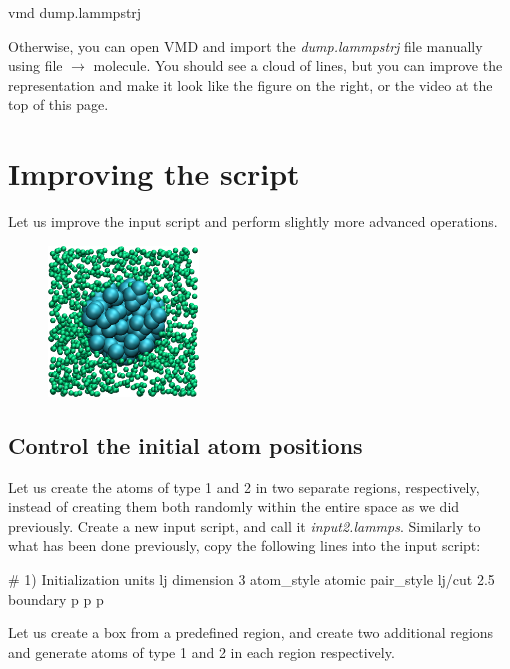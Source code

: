 \begin{lcverbatim}
vmd dump.lammpstrj
\end{lcverbatim}

\noindent Otherwise, you can open VMD and import the \textit{dump.lammpstrj}
file manually using file $\rightarrow$ molecule. You should see a cloud
of lines, but you can improve the representation and make it
look like the figure on the right, or the video at the 
top of this page. 

\section{Improving the script}

\noindent Let us improve the input script and perform slightly more
advanced operations.

\hspace{-0.45cm}\begin{figure}
\includegraphics[width=4cm]{tutorials/level0/lennard-jones-fluid/input2.png}
\end{figure}

\noindent \subsection{Control the initial atom positions}

Let us create the atoms of type 1 and 2 in two separate
regions, respectively, instead of creating them both randomly 
within the entire space as we did previously. Create a new input script, and call
it \textit{input2.lammps}. Similarly to what has been done previously, copy the following lines
into the input script:

\begin{lcverbatim}
# 1) Initialization
units lj
dimension 3
atom_style atomic
pair_style lj/cut 2.5
boundary p p p
\end{lcverbatim}

\noindent Let us create a box from a predefined region,
and create two additional regions and generate
atoms of type 1 and 2 in each region respectively.

